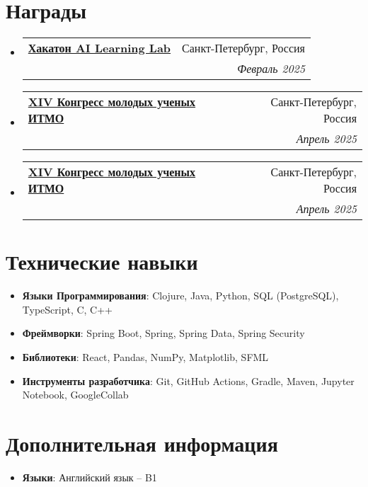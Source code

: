 \documentclass[letterpaper,11pt]{article}
\makeatletter
\newcommand{\resumeItem}[2]{
  \item\small{
    \textbf{#1}{: #2 \vspace{-2pt}}
  }
}
\newcommand{\resumeSubItem}[2]{\resumeItem{#1}{#2}\vspace{-4pt}}
\newcommand{\resumeSubHeadingListStart}{\begin{itemize}[leftmargin=*]}
\newcommand{\resumeSubHeadingListEnd}{\end{itemize}}
\newcommand{\resumeAwardSubheading}[4]{
  \vspace{-1pt}\item
    \begin{tabular*}{0.97\textwidth}[t]{p{0.67\textwidth}@{\extracolsep{\fill}}r}
      \textbf{#1} & #2 \\
      \textit{\small\parbox[t]{0.67\textwidth}{\raggedright #3}} & \textit{\small #4} \\
    \end{tabular*}\vspace{-5pt}
}
\makeatother
\begin{document}
\section{Награды}
\resumeSubHeadingListStart
\resumeAwardSubheading{
    \href{https://drive.google.com/file/d/1gs8khjhjMai1iDpcuySTskslkZBpb5XG/view?usp=sharing}
    {Хакатон AI Learning Lab}}{Санкт-Петербург, Россия}
{\textbf{Победитель}. Разработка платформы разметки данных для повышения качества обучения нейронных сетей.}{Февраль 2025}
\resumeAwardSubheading{
    \href{https://drive.google.com/file/d/1QIoI3PejwaDDYfFeW4Al2UtjX8WS3nBv/view?usp=sharing}
    {XIV Конгресс молодых ученых ИТМО}}{Санкт-Петербург, Россия}
{\textbf{Победитель номинации "Лучший доклад молодого ученого"}. Проект "Разработка сервиса разметки данных для обучения нейронных сетей"}{Апрель 2025}
\resumeAwardSubheading{
    \href{https://drive.google.com/file/d/1w0LCMTmXbGLRT5wyzHR6HV2Q5f1fHShN/view?usp=sharing}
    {XIV Конгресс молодых ученых ИТМО}}{Санкт-Петербург, Россия}
{\textbf{Победитель номинации "Лучший доклад молодого ученого"}. Проект "Разработка open-source инструмента автоматизированного машинного обучения с использованием больших языковых моделей"}{Апрель 2025}
\resumeSubHeadingListEnd


\section{Технические навыки}
\resumeSubHeadingListStart
\resumeSubItem{Языки Программирования}{Clojure, Java, Python, SQL (PostgreSQL), TypeScript, C, C++}
\resumeSubItem{Фреймворки}{Spring Boot, Spring, Spring Data, Spring Security}
\resumeSubItem{Библиотеки}{React, Pandas, NumPy, Matplotlib, SFML}
\resumeSubItem{Инструменты разработчика}{Git, GitHub Actions, Gradle, Maven, Jupyter Notebook, GoogleCollab}
\resumeSubHeadingListEnd
\section{Дополнительная информация}
\resumeSubHeadingListStart
\resumeSubItem{Языки}{Английский язык -- B1}
\resumeSubHeadingListEnd
\end{document}
